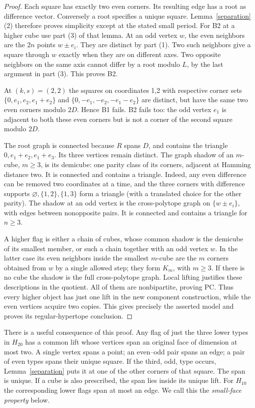 \documentclass[11pt,a4paper]{article}
\begin{document}
\begin{proof}
Each square has exactly two even corners. Its resulting edge has
a root as difference vector. Conversely a root specifies a unique
square. Lemma~\ref{separation}(2) therefore proves simplicity except
at the stated small period. For B2 at a higher cube use part (3) of
that lemma. At an odd vertex $w$, the even neighbors are the $2n$
points $w\pm e_i$. They are distinct by part (1). Two such neighbors
give a square through $w$ exactly when they are on different axes.
Two opposite neighbors on the same axis cannot differ by a root
modulo $L$, by the last argument in part (3). This proves B2.

At $(k,s)=(2,2)$ the squares on coordinates 1,2 with respective
corner sets $\{0,e_1,e_2,e_1+e_2\}$ and
$\{0,-e_1,-e_2,-e_1-e_2\}$ are distinct, but have the same
two even corners modulo $2D$. Hence B1 fails. B2 fails too:
the odd vertex $e_1$ is adjacent to both these even corners but
is not a corner of the second square modulo $2D$.

The root graph is connected because $R$ spans $D$, and contains
the triangle $0,e_1+e_2,e_1+e_3$. Its three vertices remain
distinct. The graph shadow of an $m$-cube, $m\ge3$, is its
demicube: one parity class of its corners, adjacent at Hamming
distance two. It is connected and contains a triangle. Indeed,
any even difference can be removed two coordinates at a time,
and the three corners with difference supports
$\varnothing,\{1,2\},\{1,3\}$ form a triangle (with a translated
choice for the other parity). The shadow at an odd vertex is the
cross-polytope graph on $\{w\pm e_i\}$, with edges between
nonopposite pairs. It is connected and contains a triangle for
$n\ge3$.

A higher flag is either a chain of cubes, whose common shadow is
the demicube of its smallest member, or such a chain together
with an odd vertex $w$. In the latter case its even neighbors
inside the smallest $m$-cube are the $m$ corners obtained from
$w$ by a single allowed step; they form $K_m$, with $m\ge3$.
If there is no cube the shadow is the full cross-polytope graph.
Local lifting justifies these descriptions in the quotient. All
of them are nonbipartite, proving PC. Thus every higher object has
just one lift in the new component construction, while the even
vertices acquire two copies. This gives precisely the asserted
model and proves its regular-hypertope conclusion.
\end{proof}

There is a useful consequence of this proof. Any flag of just the
three lower types in $H_{20}$ has a common lift whose vertices span
an original face of dimension at most two. A single vertex spans a
point; an even--odd pair spans an edge; a pair of even types spans
their unique square. If the third, odd, type occurs, Lemma~\ref{separation}
puts it at one of the other corners of that square. The span is
unique. If a cube is also prescribed, the span lies inside its
unique lift. For $H_{10}$ the corresponding lower flags span at
most an edge. We call this the \emph{small-face property} below.
\end{document}
